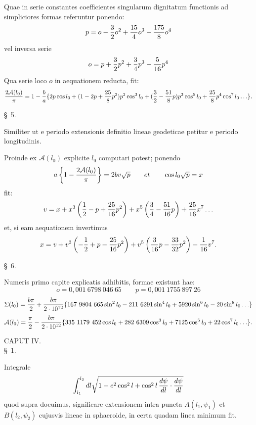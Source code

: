 Quae in serie constantes coefficientes singularum dignitatum functionis  ad simpliciores formas referuntur ponendo:
\[
 p=o-{3\over2}o^2+{15\over4}o^3-{175\over8}o^4
\]
vel inversa serie
\[
 o=p+{3\over2}p^2+{3\over4}p^3-{5\over16}p^4
\]
Qua serie loco $o$ in aequationem reducta, fit:
\[
 {2\mathcal A(l_0)\over\pi}=1-{b\over a}\{2p\cos l_0+(1-2p+{25\over8}p^2)p^2\cos^3l_0+({3\over2}-{51\over8}p)p^3\cos^5l_0+{25\over8}p^4\cos^7l_0\ldots\}.
\]

\begin{center}\S\ 5.\end{center}

Similiter ut e periodo extensionis definitio lineae geodeticae petitur e periodo longitudinis.

Proinde ex $\mathcal A(l_0)$ explicite $l_0$ computari potest; ponendo
\[
 a\left\{1-{2\mathcal A(l_0)\over\pi}\right\}=2bv\sqrt p\qquad et\qquad \cos l_0\sqrt p=x
\]
fit:
\[
 v=x+x^3\left({1\over2}-p+{25\over16}p^2\right)+x^5\left({3\over4}-{51\over16}p\right)+{25\over16}x^7\ldots
\]
et, si eam aequationem invertimus
\[
 x=v+v^3\left(-{1\over2}+p-{25\over16}p^2\right)+v^5\left({3\over16}p-{33\over32}p^2\right)-{1\over16}v^7.
\]

\begin{center}\S\ 6.\end{center}

Numeris primo capite explicatis adhibitis, formae existunt hae:
\[
 o=0{,}001\ 6798\ 046\ 65\qquad p=0{,}001\ 1755\ 897\ 26
\]
\[
 \Sigma(l_0)={b\pi\over2}+{b\pi\over2\cdot10^{12}}\{167\ 9804\ 665\sin^2l_0-211\ 6291\sin^4l_0+5920\sin^6l_0-20\sin^8l_0\ldots\}
\]
\[
 \mathcal A(l_0)={\pi\over2}-{b\pi\over2\cdot10^{12}}\{335\ 1179\ 452\cos l_0+282\ 6309\cos^3l_0+7125\cos^5l_0+22\cos^7l_0\ldots\}.
\]

\begin{center}
{\large CAPUT IV.}\\[0.8em]
\S\ 1.
\end{center}

Integrale
\[
 \int_{l_1}^{l_2}dl\sqrt{1-e^2\cos^2l+\cos^2l\,{d\psi\over dl}\cdot{d\psi\over dl}}
\]
quod supra docuimus, significare extensionem intra puncta $A(l_1,\psi_1)$ et $B(l_2,\psi_2)$ cujusvis lineae in sphaeroide, in certa quadam linea minimum fit.
